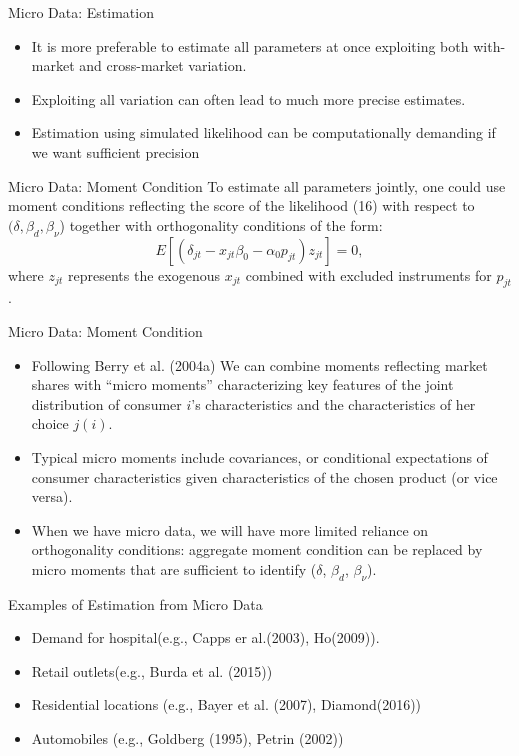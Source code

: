 \documentclass[aspectratio=169]{beamer}  %
\begin{document}
\begin{frame}{Micro Data: Estimation} 
    \begin{itemize}
    \item It is more preferable to estimate all parameters at once exploiting both with-market and cross-market variation.
    \item Exploiting all variation can often lead to much more precise estimates.
    \item Estimation using simulated likelihood can be computationally demanding if we want sufficient precision
    \end{itemize}
\end{frame}

\begin{frame}{Micro Data: Moment Condition} 
    To estimate all parameters jointly, one could use moment conditions reflecting the score of the likelihood (16) with respect to \((\delta, \beta_d, \beta_\nu\)) together with orthogonality conditions of the form:
    \begin{equation}
        E\left[ \left( \delta_{jt} - x_{jt} \beta_0 - \alpha_0 p_{jt} \right) z_{jt} \right] = 0,
    \end{equation}
    where \(z_{jt}\) represents the exogenous \(x_{jt}\) combined with excluded instruments for \(p_{jt}\).
\end{frame}

\begin{frame}{Micro Data: Moment Condition} 
    \begin{itemize}
    \item Following Berry et al. (2004a) We can combine moments reflecting market shares with “micro moments” characterizing key features of the joint distribution of consumer \(i\)’s characteristics and the characteristics of her choice \(j(i)\). 
    \item Typical micro moments include covariances, or conditional expectations of consumer characteristics given characteristics of the chosen product (or vice versa).
    \item When we have micro data, we will have more limited reliance on orthogonality conditions: aggregate moment condition can be replaced by micro moments that are sufficient to identify (\(\delta\), \(\beta_d\), \(\beta_\nu\)).
   \end{itemize}
\end{frame}

\begin{frame}{Examples of Estimation from Micro Data}
    \begin{itemize}
        \item Demand for hospital(e.g., Capps er al.(2003), Ho(2009)).
        \item Retail outlets(e.g., Burda et al. (2015))
        \item Residential locations (e.g., Bayer et al. (2007), Diamond(2016))
        \item Automobiles (e.g., Goldberg (1995), Petrin (2002)) 
    \end{itemize}
\end{frame}
\end{document}

